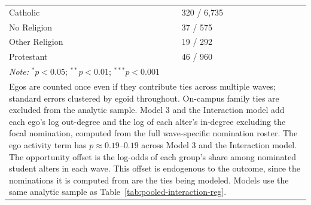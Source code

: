 \begin{table}[htbp]
{\begin{tabular}[t]{lllll}
Catholic & \multicolumn{4}{l}{320 / 6,735} \\
No Religion & \multicolumn{4}{l}{37 / 575} \\
Other Religion & \multicolumn{4}{l}{19 / 292} \\
Protestant & \multicolumn{4}{l}{46 / 960} \\
\bottomrule
\multicolumn{5}{l}{\rule{0pt}{1em}\textit{Note:} $^{*} p < 0.05$; $^{**} p < 0.01$; $^{***} p < 0.001$}\\
\multicolumn{5}{p{1.0\textwidth}}{\footnotesize Egos are counted once even if they contribute ties across multiple waves; standard errors clustered by egoid throughout. On-campus family ties are excluded from the analytic sample. Model 3 and the Interaction model add each ego's log out-degree and the log of each alter's in-degree excluding the focal nomination, computed from the full wave-specific nomination roster. The ego activity term has $p \approx 0.19$--$0.19$ across Model 3 and the Interaction model. The opportunity offset is the log-odds of each group's share among nominated student alters in each wave. This offset is endogenous to the outcome, since the nominations it is computed from are the ties being modeled. Models use the same analytic sample as Table~\ref{tab:pooled-interaction-reg}.}\\
\end{tabular}
}
\end{table}

